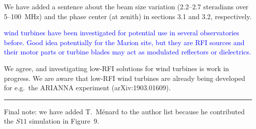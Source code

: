 \documentclass[11pt]{article}
\begin{document}
We have added a sentence about the beam size variation (2.2--2.7
steradians over 5--100~MHz) and the phase center (at zenith) in
sections 3.1 and 3.2, respectively.

\noindent \textcolor{blue}{wind turbines have been investigated for
  potential use in several observatories before. Good idea potentially
  for the Marion site, but they are RFI sources and their motor parts
  or turbine blades may act as modulated reflectors or dielectrics.}

We agree, and investigating low-RFI solutions for wind turbines is
work in progress.  We are aware that low-RFI wind turbines are already
being developed for e.g.\ the ARIANNA experiment (arXiv:1903.01609).

\noindent\rule{\textwidth}{0.7pt}

Final note: we have added T.~M\'enard to the author list because he
contributed the $S11$ simulation in Figure~9.
\end{document}
